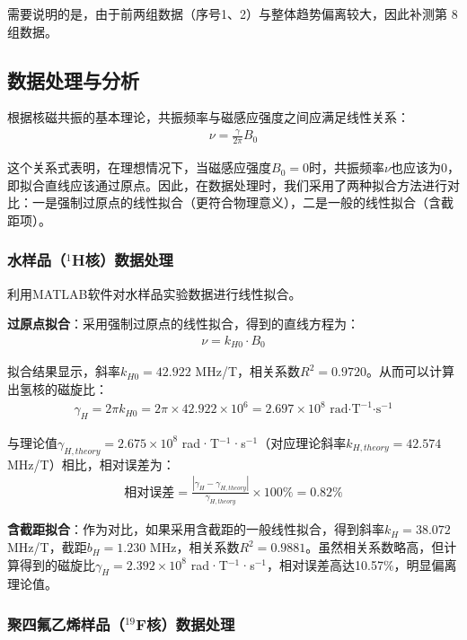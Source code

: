 ﻿\documentclass[12pt,a4paper]{article}
\begin{document}
需要说明的是，由于前两组数据（序号1、2）与整体趋势偏离较大，因此补测第 8 组数据。

\subsection{数据处理与分析}

根据核磁共振的基本理论，共振频率与磁感应强度之间应满足线性关系：
\begin{align}
\nu = \frac{\gamma}{2\pi} B_0
\end{align}

这个关系式表明，在理想情况下，当磁感应强度$B_0 = 0$时，共振频率$\nu$也应该为0，即拟合直线应该通过原点。因此，在数据处理时，我们采用了两种拟合方法进行对比：一是强制过原点的线性拟合（更符合物理意义），二是一般的线性拟合（含截距项）。

\subsubsection{水样品（$^1$H核）数据处理}

利用MATLAB软件对水样品实验数据进行线性拟合。

\textbf{过原点拟合}：采用强制过原点的线性拟合，得到的直线方程为：
\begin{align}
\nu = k_{H0} \cdot B_0
\end{align}

拟合结果显示，斜率$k_{H0} = 42.922$ MHz/T，相关系数$R^2 = 0.9720$。从而可以计算出氢核的磁旋比：
\begin{align}
\gamma_H = 2\pi k_{H0} = 2\pi \times 42.922 \times 10^6 = 2.697 \times 10^8 \text{ rad·T}^{-1}\text{·s}^{-1}
\end{align}

与理论值$\gamma_{H,theory} = 2.675 \times 10^8$ rad·T$^{-1}$·s$^{-1}$（对应理论斜率$k_{H,theory} = 42.574$ MHz/T）相比，相对误差为：
\begin{align}
\text{相对误差} = \frac{|\gamma_H - \gamma_{H,theory}|}{\gamma_{H,theory}} \times 100\% = 0.82\%
\end{align}

\textbf{含截距拟合}：作为对比，如果采用含截距的一般线性拟合，得到斜率$k_H = 38.072$ MHz/T，截距$b_H = 1.230$ MHz，相关系数$R^2 = 0.9881$。虽然相关系数略高，但计算得到的磁旋比$\gamma_H = 2.392 \times 10^8$ rad·T$^{-1}$·s$^{-1}$，相对误差高达10.57\%，明显偏离理论值。

\subsubsection{聚四氟乙烯样品（$^{19}$F核）数据处理}
\end{document}
